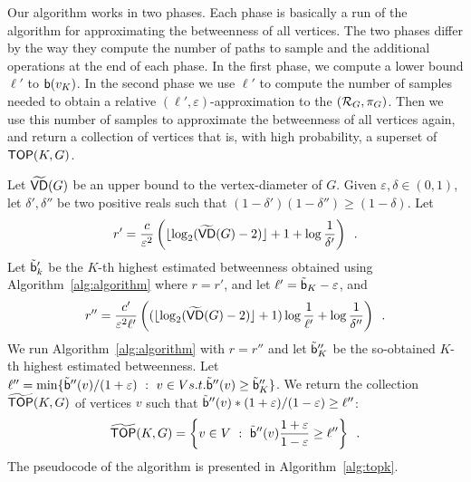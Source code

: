 Our algorithm works in two phases. Each phase is basically a run of the
algorithm for approximating the betweenness of all vertices. %
The two phases differ by the way they compute the number of paths to sample and
the additional operations at the end of each phase. In the first
phase, we compute a lower bound $\ell'$ to $\mathsf{b}(v_K)$. In the second phase we
use $\ell'$ to compute the number of samples needed to obtain a relative
$(\ell',\varepsilon)$-approximation to the $(\mathcal{R}_G,\pi_G)$. Then we use this
number of samples to approximate the betweenness of all vertices again, and
return a collection of vertices that is, with high probability, a superset of
$\mathsf{TOP}(K,G)$.

Let $\widetilde{\mathsf{VD}}(G)$ be an upper bound to the vertex-diameter of $G$. Given
$\varepsilon,\delta\in(0,1)$, let $\delta',\delta''$ be two positive reals such
that $(1-\delta')(1-\delta'')\ge(1-\delta)$. Let
\[
r'=\frac{c}{\varepsilon^2}\left(\lfloor\log_2(\widetilde{\mathsf{VD}}(G)-2)\rfloor+1+\log\frac{1}{\delta'}\right)\enspace.
\]
Let $\tilde{\mathsf{b}}'_k$ be the $K$-th highest estimated betweenness obtained using
Algorithm~\ref{alg:algorithm} where $r=r'$, and let
  $\ell'=\tilde{\mathsf{b}}_K-\varepsilon$, %
and
\[
r''=\frac{c'}{\varepsilon^2\ell'}\left((\lfloor\log_2(\widetilde{\mathsf{VD}}(G)-2)\rfloor+1)\log\frac{1}{\ell'}+\log\frac{1}{\delta''}\right)\enspace.
\]
We run Algorithm~\ref{alg:algorithm} with $r=r''$ and let $\tilde{\mathsf{b}}''_K$ be
the so-obtained $K$-th highest estimated betweenness. Let
$\ell''=\min\{\tilde{\mathsf{b}}''(v) / (1+\varepsilon) ~:~ v\in V \relax{ s.t. }
\tilde{\mathsf{b}}''(v)\ge\tilde{\mathsf{b}}''_K\}$. We
return the collection $\widetilde{\mathsf{TOP}}(K,G)$ of vertices $v$ such that
$\tilde{\mathsf{b}}''(v)*(1+\varepsilon)/(1-\varepsilon)\ge\ell''$:
\[
\widetilde{\mathsf{TOP}}(K,G)= \left\{v\in V ~:~
\tilde{\mathsf{b}}''(v)\frac{1+\varepsilon}{1-\varepsilon}\ge\ell''\right\}\enspace.
\]
\ifproof
The pseudocode of the algorithm is presented in Algorithm~\ref{alg:topk}.

